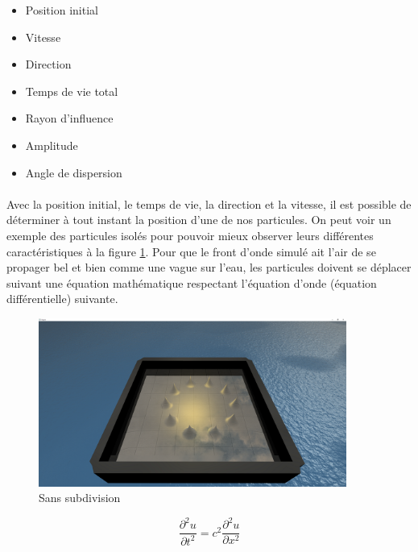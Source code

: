 \documentclass[a4paper, 12pt]{article} %
\begin{document}
	\begin{itemize}
	    \item Position initial
	    \item Vitesse
	    \item Direction
	    \item Temps de vie total
	    \item Rayon d'influence
	    \item Amplitude
	    \item Angle de dispersion
	\end{itemize}

	\paragraph{}
	Avec la position initial, le temps de vie, la direction et la vitesse, il est possible de 
	déterminer à tout instant la position d'une de nos particules. On peut voir un exemple des particules
	isolés pour pouvoir mieux observer leurs différentes caractéristiques à la figure \ref{NoSubdivide}.
	Pour que le front d'onde simulé ait l'air de se propager bel et bien comme une vague
	sur l'eau, les particules doivent se déplacer suivant une équation mathématique respectant
	l'équation d'onde (équation différentielle) suivante.

	\begin{figure}
		\centering
		\includegraphics[width=0.9\textwidth]{./PhotoRapport/NoSubdivide.png}
		\caption{Sans subdivision}
		\label{NoSubdivide}
	\end{figure}

	\begin{equation}
	    \frac{\partial^{2}u}{\partial t^{2}} = c^{2} \frac {\partial^{2}u} {\partial x^{2}}
	\end{equation}
\end{document}
